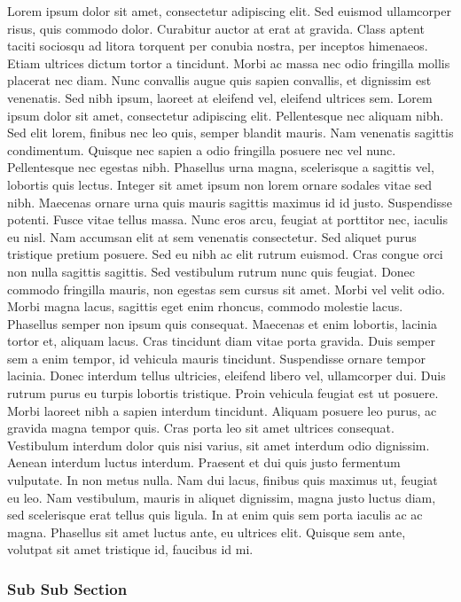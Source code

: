Lorem ipsum dolor sit amet, consectetur adipiscing elit.  Sed euismod ullamcorper risus, quis commodo dolor. Curabitur auctor at erat at gravida. Class aptent taciti sociosqu ad litora torquent per conubia nostra, per inceptos himenaeos. Etiam ultrices dictum tortor a tincidunt. Morbi ac massa nec odio fringilla mollis placerat nec diam. Nunc convallis augue quis sapien convallis, et dignissim est venenatis. Sed nibh ipsum, laoreet at eleifend vel, eleifend ultrices sem. Lorem ipsum dolor sit amet, consectetur adipiscing elit. Pellentesque nec aliquam nibh. Sed elit lorem, finibus nec leo quis, semper blandit mauris.
Nam venenatis sagittis condimentum. Quisque nec sapien a odio fringilla posuere nec vel nunc. Pellentesque nec egestas nibh. Phasellus urna magna, scelerisque a sagittis vel, lobortis quis lectus. Integer sit amet ipsum non lorem ornare sodales vitae sed nibh. Maecenas ornare urna quis mauris sagittis maximus id id justo. Suspendisse potenti. Fusce vitae tellus massa. Nunc eros arcu, feugiat at porttitor nec, iaculis eu nisl. Nam accumsan elit at sem venenatis consectetur. Sed aliquet purus tristique pretium posuere. Sed eu nibh ac elit rutrum euismod. Cras congue orci non nulla sagittis sagittis. Sed vestibulum rutrum nunc quis feugiat. Donec commodo fringilla mauris, non egestas sem cursus sit amet.
Morbi vel velit odio. Morbi magna lacus, sagittis  eget enim rhoncus, commodo molestie lacus. Phasellus semper non ipsum quis consequat. Maecenas et enim lobortis, lacinia tortor et, aliquam lacus. Cras tincidunt diam vitae porta gravida. Duis semper sem a enim tempor, id vehicula mauris tincidunt. Suspendisse ornare tempor lacinia.
Donec interdum tellus ultricies, eleifend libero vel, ullamcorper dui.  Duis rutrum purus eu turpis lobortis tristique. Proin vehicula feugiat est ut posuere. Morbi laoreet nibh a sapien interdum tincidunt. Aliquam posuere leo purus, ac gravida magna tempor quis. Cras porta leo sit amet ultrices consequat. Vestibulum interdum dolor quis nisi varius, sit amet interdum odio dignissim. Aenean interdum luctus interdum. Praesent et dui quis justo fermentum vulputate. In non metus nulla. Nam dui lacus, finibus quis maximus ut, feugiat eu leo. Nam vestibulum, mauris in aliquet dignissim, magna justo luctus diam, sed scelerisque erat tellus quis ligula. In at enim quis sem porta iaculis ac ac magna. Phasellus sit amet luctus ante, eu ultrices elit. Quisque sem ante, volutpat sit amet tristique id, faucibus id mi.

\subsubsection{Sub Sub Section}


